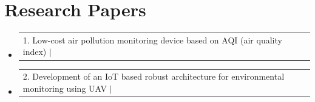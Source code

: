 \documentclass[letterpaper,11pt]{article}
\makeatletter
\newcommand{\resumeItem}[1]{
  \item\small{
    {\justifying #1 \vspace{-2pt}}
  }
}
\newcommand{\resumeProjectHeading}[2]{
    \item
    \begin{tabular*}{1.001\textwidth}{l@{\extracolsep{\fill}}r}
      \small#1 & \textbf{\small }\\
    \end{tabular*}\vspace{-10pt}
}
\newcommand{\resumeSubHeadingListStart}{\begin{itemize}[leftmargin=0.0in, label={}]}
\newcommand{\resumeSubHeadingListEnd}{\end{itemize}}
\newcommand{\resumeItemListStart}{\begin{itemize}}
\newcommand{\resumeItemListEnd}{\end{itemize}\vspace{-5pt}}
\makeatother
\begin{document}
\section{Research Papers}
\vspace{-9pt}
    \resumeSubHeadingListStart
    \resumeProjectHeading
    {1. Low-cost air pollution monitoring device based on AQI (air quality index) $|$ {\href{https://papers.ssrn.com/sol3/papers.cfm?abstract_id=3515043}{\faIcon{link}{ Link}}}}{}%
          \resumeItemListStart
          \resumeItemListEnd
    \vspace{-10pt}
      \resumeProjectHeading
          {2. Development of an IoT based robust architecture for environmental monitoring using UAV $|$ {\href{https://ieeexplore.ieee.org/document/9028987}{\faIcon{link}{ Link}}}}{}
          \resumeItemListStart
          \resumeItemListEnd
    \resumeSubHeadingListEnd
\end{document}
